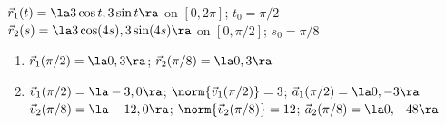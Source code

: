 {$\vec r_1(t) = \la 3\cos t,3\sin t\ra$ on $[0,2\pi]$; $t_0 = \pi/2$\\
$\vec r_2(s) = \la 3\cos (4s),3\sin(4s)\ra$ on $[0,\pi/2]$; $s_0 = \pi/8$
}
{
\begin{enumerate}
	\item $\vec r_1(\pi/2) = \la0,3\ra$; $\vec r_2(\pi/8) = \la 0,3\ra$
	\item	$\vec v_1(\pi/2) = \la -3,0\ra$; $\norm{\vec v_1(\pi/2)} = 3$; $\vec a_1(\pi/2) = \la 0,-3\ra$\\
			$\vec v_2(\pi/8) = \la -12,0\ra$; $\norm{\vec v_2(\pi/8)} = 12$; $\vec a_2(\pi/8) = \la 0,-48\ra$
\end{enumerate}
}